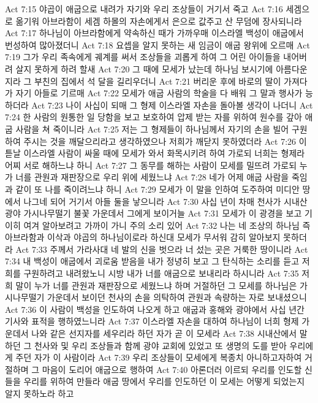 Act 7:15  야곱이 애굽으로 내려가 자기와 우리 조상들이 거기서 죽고
Act 7:16  세겜으로 옮기워 아브라함이 세겜 하몰의 자손에게서 은으로 값주고 산 무덤에 장사되니라
Act 7:17  하나님이 아브라함에게 약속하신 때가 가까우매 이스라엘 백성이 애굽에서 번성하여 많아졌더니
Act 7:18  요셉을 알지 못하는 새 임금이 애굽 왕위에 오르매
Act 7:19  그가 우리 족속에게 궤계를 써서 조상들을 괴롭게 하여 그 어린 아이들을 내어버려 살지 못하게 하려 할새
Act 7:20  그 때에 모세가 났는데 하나님 보시기에 아름다운지라 그 부친의 집에서 석 달을 길리우더니
Act 7:21  버리운 후에 바로의 딸이 가져다가 자기 아들로 기르매
Act 7:22  모세가 애굽 사람의 학술을 다 배워 그 말과 행사가 능하더라
Act 7:23  나이 사십이 되매 그 형제 이스라엘 자손을 돌아볼 생각이 나더니
Act 7:24  한 사람의 원통한 일 당함을 보고 보호하여 압제 받는 자를 위하여 원수를 갚아 애굽 사람을 쳐 죽이니라
Act 7:25  저는 그 형제들이 하나님께서 자기의 손을 빌어 구원하여 주시는 것을 깨달으리라고 생각하였으나 저희가 깨닫지 못하였더라
Act 7:26  이튿날 이스라엘 사람이 싸울 때에 모세가 와서 화목시키려 하여 가로되 너희는 형제라 어찌 서로 해하느냐 하니
Act 7:27  그 동무를 해하는 사람이 모세를 밀뜨려 가로되 누가 너를 관원과 재판장으로 우리 위에 세웠느냐
Act 7:28  네가 어제 애굽 사람을 죽임과 같이 또 나를 죽이려느냐 하니
Act 7:29  모세가 이 말을 인하여 도주하여 미디안 땅에서 나그네 되어 거기서 아들 둘을 낳으니라
Act 7:30  사십 년이 차매 천사가 시내산 광야 가시나무떨기 불꽃 가운데서 그에게 보이거늘
Act 7:31  모세가 이 광경을 보고 기이히 여겨 알아보려고 가까이 가니 주의 소리 있어
Act 7:32  나는 네 조상의 하나님 즉 아브라함과 이삭과 야곱의 하나님이로라 하신대 모세가 무서워 감히 알아보지 못하더라
Act 7:33  주께서 가라사대 네 발의 신을 벗으라 너 섰는 곳은 거룩한 땅이니라
Act 7:34  내 백성이 애굽에서 괴로움 받음을 내가 정녕히 보고 그 탄식하는 소리를 듣고 저희를 구원하려고 내려왔노니 시방 내가 너를 애굽으로 보내리라 하시니라
Act 7:35  저희 말이 누가 너를 관원과 재판장으로 세웠느냐 하며 거절하던 그 모세를 하나님은 가시나무떨기 가운데서 보이던 천사의 손을 의탁하여 관원과 속량하는 자로 보내셨으니
Act 7:36  이 사람이 백성을 인도하여 나오게 하고 애굽과 홍해와 광야에서 사십 년간 기사와 표적을 행하였느니라
Act 7:37  이스라엘 자손을 대하여 하나님이 너희 형제 가운데서 나와 같은 선지자를 세우리라 하던 자가 곧 이 모세라
Act 7:38  시내산에서 말하던 그 천사와 및 우리 조상들과 함께 광야 교회에 있었고 또 생명의 도를 받아 우리에게 주던 자가 이 사람이라
Act 7:39  우리 조상들이 모세에게 복종치 아니하고자하여 거절하며 그 마음이 도리어 애굽으로 행하여
Act 7:40  아론더러 이르되 우리를 인도할 신들을 우리를 위하여 만들라 애굽 땅에서 우리를 인도하던 이 모세는 어떻게 되었는지 알지 못하노라 하고
